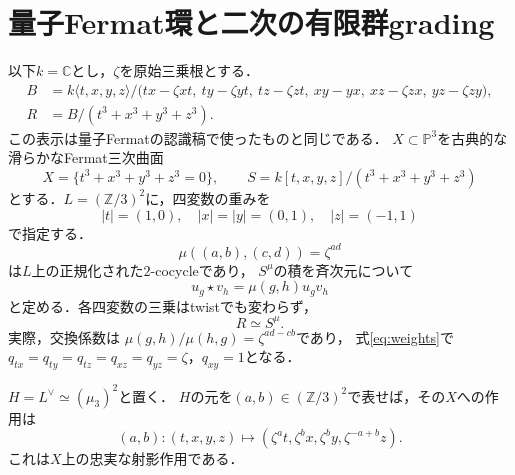 \documentclass[11pt,a4paper]{ltjsarticle}
\theoremstyle{definition}
\begin{document}
\section{量子Fermat環と二次の有限群grading}
以下$k=\mathbb C$とし，$\zeta$を原始三乗根とする．
\[
\begin{aligned}
 B&=k\langle t,x,y,z\rangle/\bigl(
 tx-\zeta xt,\ ty-\zeta yt,\ tz-\zeta zt,\
 xy-yx,\ xz-\zeta zx,\ yz-\zeta zy\bigr),\\
 R&=B/(t^3+x^3+y^3+z^3).
 \end{aligned}
\]
この表示は量子Fermatの認識稿\cite{Current}で使ったものと同じである．
$X\subset\mathbb P^3$を古典的な滑らかなFermat三次曲面
\[
 X=\{t^3+x^3+y^3+z^3=0\},\qquad
 S=k[t,x,y,z]/(t^3+x^3+y^3+z^3)
\]
とする．$L=(\mathbb Z/3)^2$に，四変数の重みを
\begin{equation}\label{eq:weights}
 |t|=(1,0),\quad |x|=|y|=(0,1),\quad |z|=(-1,1)
\end{equation}
で指定する．
\[
 \mu((a,b),(c,d))=\zeta^{ad}
\]
は$L$上の正規化された$2$-cocycleであり，
$S^\mu$の積を斉次元について
\[
 u_g\star v_h=\mu(g,h)u_gv_h
\]
と定める．各四変数の三乗はtwistでも変わらず，
\begin{equation}\label{eq:cocycle-identification}
 R\simeq S^\mu.
\end{equation}
実際，交換係数は
$\mu(g,h)/\mu(h,g)=\zeta^{ad-cb}$であり，
式\eqref{eq:weights}で
$q_{tx}=q_{ty}=q_{tz}=q_{xz}=q_{yz}=\zeta$，$q_{xy}=1$となる．

$H=L^\vee\simeq(\mu_3)^2$と置く．
$H$の元を$(a,b)\in(\mathbb Z/3)^2$で表せば，その$X$への作用は
\begin{equation}\label{eq:H-action}
 (a,b):(t,x,y,z)\longmapsto
 (\zeta^at,\zeta^bx,\zeta^by,\zeta^{-a+b}z).
\end{equation}
これは$X$上の忠実な射影作用である．
\end{document}
